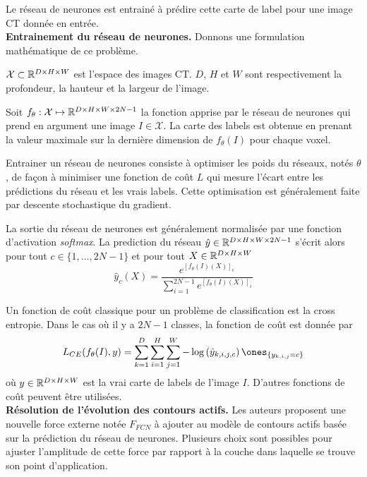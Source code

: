 \documentclass[a4paper, 11pt]{article}
\begin{document}
Le réseau de neurones est entrainé à prédire cette carte de label pour une image CT donnée en entrée. \\ 

\textbf{Entrainement du réseau de neurones.} Donnons une formulation mathématique de ce problème. 

$\mathcal{X}\subset \mathbb{R}^{D\times H\times W} $ est l'espace des images CT. $D$, $H$ et $W$ sont respectivement la profondeur, la hauteur et la largeur de l'image. 

Soit $f_\theta : \mathcal{X} \mapsto \mathbb{R}^{D\times H\times W\times 2N-1}$ la fonction apprise par le réseau de neurones qui prend en argument une image $I\in\mathcal{X}$. La carte des labels est obtenue en prenant la valeur maximale sur la dernière dimension de $f_{\theta}(I)$ pour chaque voxel.

Entrainer un réseau de neurones consiste à optimiser les poids du réseaux, notés $\theta$, de façon à minimiser une fonction de coût $L$ qui mesure l'écart entre les prédictions du réseau et les vrais labels. Cette optimisation est généralement faite par descente stochastique du gradient.

La sortie du réseau de neurones est généralement normalisée par une fonction d'activation \textit{softmax}. La prediction du réseau $\hat{y}\in\mathbb{R}^{D\times H\times W\times 2N-1}$ s'écrit alors pour tout $c\in\{1, \dots, 2N-1\}$ et pour tout $X\in \mathbb{R}^{D\times H\times W}$
$$
\hat{y}_c(X) =  \frac{e^{[f_{\theta}(I)(X)]_c}}{\sum_{i=1}^{2N-1} e^{[f_{\theta}(I)(X)]_i}}
$$

Un fonction de coût classique pour un problème de classification est la cross entropie. Dans le cas où il y a $2N-1$ classes, la fonction de coût est donnée par
\begin{equation}
    L_{CE}(f_{\theta}(I), y) = \sum_{k=1}^{D}\sum_{i=1}^{H}\sum_{j=1}^{W} - \log\left(  \hat{y}_{k,i,j,c}\right) \ones_{\{y_{k,i,j} = c\}}
\end{equation}
où $y\in\mathbb{R}^{D\times H\times W}$ est la vrai carte de labels de l'image $I$. D'autres fonctions de coût peuvent être utilisées. \\ 

\textbf{Résolution de l'évolution des contours actifs.} Les auteurs proposent une nouvelle force externe notée $F_{FCN}$ à ajouter au modèle de contours actifs basée sur la prédiction du réseau de neurones. Plusieurs choix sont possibles pour ajuster l'amplitude de cette force par rapport à la couche dans laquelle se trouve son point d'application. %
\end{document}
